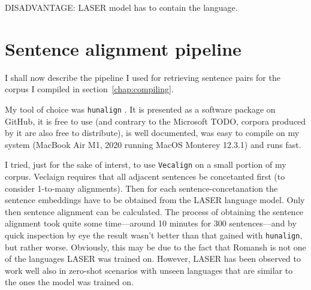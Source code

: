 DISADVANTAGE: LASER model has to contain the language.

\section{Sentence alignment pipeline}

I shall now describe the pipeline I used for retrieving sentence pairs for the corpus I compiled in section~\ref{chap:compiling}.

My tool of choice was \texttt{hunalign} \autocite{hunalign}. 
It is presented as a software package on GitHub, it is free to use (and contrary to the Microsoft TODO, corpora produced by it are also free to distribute), is well documented, was easy to compile on my system (MacBook Air M1, 2020 running MacOS Monterey 12.3.1) and runs fast. 

I tried, just for the sake of interst, to use \texttt{Vecalign} on a small portion of my corpus. 
Veclaign requires that all adjacent sentences be concetanted first (to consider 1-to-many alignments). 
Then for each sentence-concetanation the sentence embeddings have to be obtained from the LASER language model. 
Only then sentence alignment can be calculated. 
The process of obtaining the sentence alignment took quite some time---around 10 minutes for 300 sentences---and by quick inspection by eye the result wasn't better than that gained with \texttt{hunalign}, but rather worse. 
Obviously, this may be due to the fact that Romansh is not one of the languages LASER was trained on. 
However, LASER has been observed to work well also in zero-shot scenarios with unseen languages that are similar to the ones the model was trained on.

